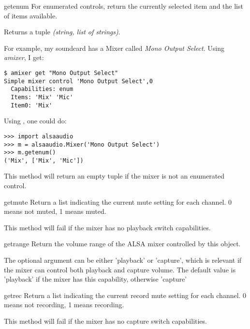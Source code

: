 \begin{methoddesc}[Mixer]{getenum}{}
  For enumerated controls, return the currently selected item and 
  the list of items available.

  Returns a tuple \textit{(string, list of strings)}. 
  
  For example, my soundcard has a Mixer called \textit{Mono Output Select}.
  Using \textit{amixer}, I get:

\begin{verbatim}
$ amixer get "Mono Output Select"
Simple mixer control 'Mono Output Select',0
  Capabilities: enum
  Items: 'Mix' 'Mic'
  Item0: 'Mix'
\end{verbatim}

  Using , one could do:
\begin{verbatim}
>>> import alsaaudio
>>> m = alsaaudio.Mixer('Mono Output Select')
>>> m.getenum()
('Mix', ['Mix', 'Mic'])
\end{verbatim}

  This method will return an empty tuple if the mixer is not an 
  enumerated control.
\end{methoddesc}

\begin{methoddesc}[Mixer]{getmute}{}
  Return a list indicating the current mute setting for each channel.
  0 means not muted, 1 means muted.

  This method will fail if the mixer has no playback switch
  capabilities.
\end{methoddesc}

\begin{methoddesc}[Mixer]{getrange}{}
  Return the volume range of the ALSA mixer controlled by this object.

  The optional  argument can be either 'playback' or
  'capture', which is relevant if the mixer can control both playback
  and capture volume.  The default value is 'playback' if the mixer
  has this capability, otherwise 'capture'

\end{methoddesc}

\begin{methoddesc}[Mixer]{getrec}{}
  Return a list indicating the current record mute setting for each
  channel. 0 means not recording, 1 means recording.

  This method will fail if the mixer has no capture switch
  capabilities.
\end{methoddesc}

